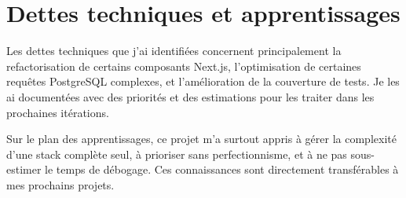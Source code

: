 \section{Dettes techniques et apprentissages}

Les dettes techniques que j'ai identifiées concernent principalement la refactorisation de certains composants Next.js, l'optimisation de certaines requêtes PostgreSQL complexes, et l'amélioration de la couverture de tests. Je les ai documentées avec des priorités et des estimations pour les traiter dans les prochaines itérations.

Sur le plan des apprentissages, ce projet m'a surtout appris à gérer la complexité d'une stack complète seul, à prioriser sans perfectionnisme, et à ne pas sous-estimer le temps de débogage. Ces connaissances sont directement transférables à mes prochains projets.

